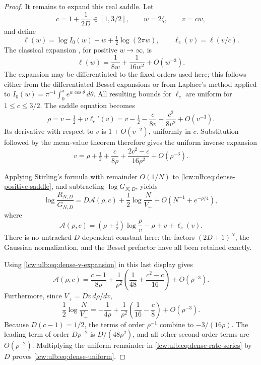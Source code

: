 \documentclass[11pt,letterpaper]{article}
\theoremstyle{remark}\newtheorem{remark}[theorem]{Remark}
\begin{document}
\begin{proof}
It remains to expand this real saddle. Let
\[
 c=1+\frac1{2D}\in[1,3/2],\qquad
 w=2\zeta,\qquad v=cw,
\]
and define
\[
 \ell(w)=\log I_0(w)-w+\tfrac12\log(2\pi w),\qquad
 \ell_c(v)=\ell(v/c).
\]
The classical expansion \cite{dlmf1040}, for positive $w\to\infty$, is
\begin{equation}\label{lcw:ulb:eq:dense-bessel-log}
 \ell(w)=\frac1{8w}+\frac1{16w^2}+O(w^{-3}).
\end{equation}
The expansion may be differentiated to the fixed orders used here;
this follows either from the differentiated Bessel expansions or
from Laplace's method applied to
$I_0(w)=\pi^{-1}\int_0^\pi e^{w\cos\theta}\,d\theta$.
All resulting bounds for $\ell_c$ are uniform for $1\le c\le3/2$.
The saddle equation becomes
\begin{equation}\label{lcw:ulb:eq:dense-v-equation}
 \rho=v-\tfrac12+v\ell_c'(v)
      =v-\tfrac12-\frac{c}{8v}-\frac{c^2}{8v^2}+O(v^{-3}).
\end{equation}
Its derivative with respect to $v$ is $1+O(v^{-2})$, uniformly
in $c$. Substitution followed by the mean-value theorem therefore
gives the uniform inverse expansion
\begin{equation}\label{lcw:ulb:eq:dense-v-expansion}
 v=\rho+\tfrac12+\frac{c}{8\rho}
       +\frac{2c^2-c}{16\rho^2}+O(\rho^{-3}).
\end{equation}

Applying Stirling's formula with remainder $O(1/N)$ to
\eqref{lcw:ulb:eq:dense-positive-saddle}, and subtracting $\log G_{N,D}$,
yields
\begin{equation}\label{lcw:ulb:eq:dense-rate-representation}
 \log\frac{R_{N,D}}{G_{N,D}}
   =D\mathcal A(\rho,c)+\frac12\log\frac{N}{V_+}
       +O\left(N^{-1}+e^{-\rho/4}\right),
\end{equation}
where
\[
 \mathcal A(\rho,c)
   =(\rho+\tfrac12)\log\frac\rho v-\rho+v+\ell_c(v).
\]
There is no untracked $D$-dependent constant here: the factors
$(2D+1)^N$, the Gaussian normalization, and the Bessel prefactor
have all been retained exactly.

Using \eqref{lcw:ulb:eq:dense-v-expansion} in this last display gives
\begin{equation}\label{lcw:ulb:eq:dense-rate-series}
 \mathcal A(\rho,c)
 =\frac{c-1}{8\rho}
   +\frac{1}{\rho^2}\left(\frac1{48}+\frac{c^2-c}{16}\right)
   +O(\rho^{-3}).
\end{equation}
Furthermore, since $V_+=D v\,d\rho/dv$,
\[
 \frac12\log\frac{N}{V_+}
 =-\frac1{4\rho}
   +\frac1{\rho^2}\left(\frac1{16}-\frac c8\right)
   +O(\rho^{-3}).
\]
Because $D(c-1)=1/2$, the terms of order $\rho^{-1}$ combine
to $-3/(16\rho)$. The leading term of order $D\rho^{-2}$
is $D/(48\rho^2)$, and all other second-order terms are
$O(\rho^{-2})$. Multiplying the uniform remainder in
\eqref{lcw:ulb:eq:dense-rate-series} by $D$ proves
\eqref{lcw:ulb:eq:dense-uniform}.


\end{proof}
\end{document}
